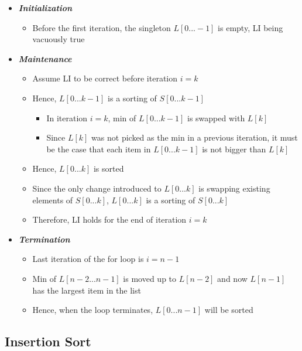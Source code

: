 \documentclass[10pt, 
a4paper, 
oneside, 
headinclude, footinclude, 
BCOR5mm]
{scrartcl}
\begin{document}
\begin{definition}
\begin{itemize}
\begin{itemize}
            \item \textit{\textbf{Initialization}}
            \begin{itemize}
                \item Before the first iteration, the singleton $L[0...-1]$ is empty, LI being vacuously true
            \end{itemize}
            \item \textit{\textbf{Maintenance}}
            \begin{itemize}
                \item Assume LI to be correct before iteration $i=k$
                \item Hence, $L[0...k-1]$ is a sorting of $S[0...k-1]$
                \begin{itemize}
                    \item In iteration $i=k$, min of $L[0...k-1]$ is swapped with $L[k]$
                    \item Since $L[k]$ was not picked as the min in a previous iteration, it must be the case that each item in $L[0...k-1]$ is not bigger than $L[k]$ 
                \end{itemize}
                \item Hence, $L[0...k]$ is sorted
                \item Since the only change introduced to $L[0...k]$ is swapping existing elements of $S[0...k]$, $L[0...k]$ is a sorting of $S[0...k]$
                \item Therefore, LI holds for the end of iteration $i=k$
            \end{itemize}
            \item \textit{\textbf{Termination}}
            \begin{itemize}
                \item Last iteration of the for loop is $i=n-1$
                \item Min of $L[n-2...n-1]$ is moved up to $L[n-2]$ and now $L[n-1]$ has the largest item in the list
                \item Hence, when the loop terminates, $L[0...n-1]$ will be sorted
            \end{itemize}
        \end{itemize}
    \end{itemize}
\end{definition}
\newpage
\subsection{Insertion Sort}
\end{document}
